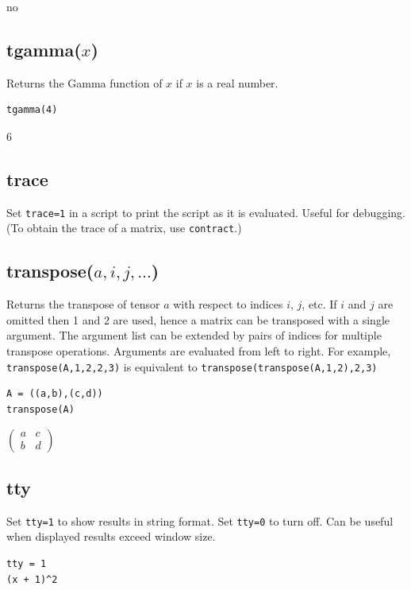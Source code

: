 \documentclass[12pt]{article}
\begin{document}
no

\subsection*{tgamma($x$)}

Returns the Gamma function of $x$ if $x$ is a real number.

{\color{blue}
\begin{verbatim}
tgamma(4)
\end{verbatim}
}

$6$

\subsection*{trace}

Set \verb$trace=1$ in a script to print the script as it is evaluated.
Useful for debugging.
(To obtain the trace of a matrix, use \verb$contract$.)

\subsection*{transpose($a,i,j,\ldots$)}

Returns the transpose of tensor $a$ with respect to indices $i$, $j$, etc.
If $i$ and $j$ are omitted then 1 and 2 are used,
hence a matrix can be transposed with a single argument.
The argument list can be extended by pairs of indices for multiple transpose operations.
Arguments are evaluated from left to right.
For example,
\verb$transpose(A,1,2,2,3)$
is equivalent to
\verb$transpose(transpose(A,1,2),2,3)$

{\color{blue}
\begin{verbatim}
A = ((a,b),(c,d))
transpose(A)
\end{verbatim}
}

$\displaystyle
\begin{pmatrix}
a & c
\\[1ex]
b & d
\end{pmatrix}
$

\subsection*{tty}

Set \verb$tty=1$ to show results in string format.
Set \verb$tty=0$ to turn off.
Can be useful when displayed results exceed window size.

{\color{blue}
\begin{verbatim}
tty = 1
(x + 1)^2
\end{verbatim}
}
\end{document}
